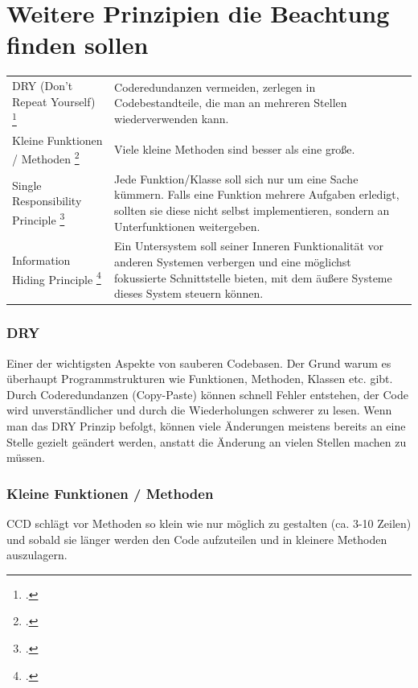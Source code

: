 
\section{Weitere Prinzipien die Beachtung finden sollen}

\bigskip
\begin{tabularx}{\textwidth}{p{160 pt}|X}
DRY  (Don't Repeat Yourself) \footcite[S. 80 und S. 342]{Martin2009}  & Coderedundanzen vermeiden, zerlegen in Codebestandteile, die man an mehreren Stellen wiederverwenden kann. \\
Kleine Funktionen / Methoden \footcite[S. 64]{Martin2009} & Viele kleine Methoden sind besser als eine große. \\
Single Responsibility Principle \footcite[S. 176 f.]{Martin2009} & Jede Funktion/Klasse soll sich nur um eine Sache kümmern. Falls eine Funktion mehrere 
Aufgaben erledigt, sollten sie diese nicht selbst implementieren, sondern an Unterfunktionen weitergeben. \\
Information Hiding Principle \footcite[S. 48 f.]{schummelzettel}  & Ein Untersystem soll seiner Inneren Funktionalität vor anderen Systemen verbergen und eine möglichst fokussierte Schnittstelle bieten, mit dem äußere Systeme dieses System steuern können.\\
\end{tabularx}


\subsubsection{DRY}

Einer der wichtigsten Aspekte von sauberen Codebasen. Der Grund warum es überhaupt 
Programmstrukturen wie Funktionen, Methoden, Klassen etc. gibt.
Durch Coderedundanzen (Copy-Paste) können schnell Fehler entstehen, der Code
wird unverständlicher und durch die Wiederholungen schwerer zu lesen.
Wenn man das DRY Prinzip befolgt, können viele Änderungen meistens bereits an
eine Stelle gezielt geändert werden, anstatt die Änderung an vielen Stellen
machen zu müssen.

\subsubsection{Kleine Funktionen / Methoden}

CCD schlägt vor Methoden so klein wie nur möglich zu gestalten (ca. 3-10 Zeilen) und sobald 
sie länger werden den Code aufzuteilen und in kleinere Methoden auszulagern.

